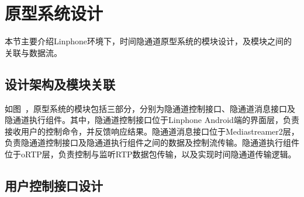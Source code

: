 \section{原型系统设计}
\label{chap:linphone:designation}

本节主要介绍Linphone环境下，时间隐通道原型系统的模块设计，及模块之间的关联与数据流。

\subsection{设计架构及模块关联}
\label{chap:linphone:designation:struct}


如图\ ，原型系统的模块包括三部分，分别为隐通道控制接口、隐通道消息接口及隐通道执行组件。其中，隐通道控制接口位于Linphone Android端的界面层，负责接收用户的控制命令，并反馈响应结果。隐通道消息接口位于Mediastreamer2层，负责隐通道控制接口及隐通道执行组件之间的数据及控制流传输。隐通道执行组件位于oRTP层，负责控制与监听RTP数据包传输，以及实现时间隐通道传输逻辑。

\subsection{用户控制接口设计}
\label{chap:linphone:designation:ui}

